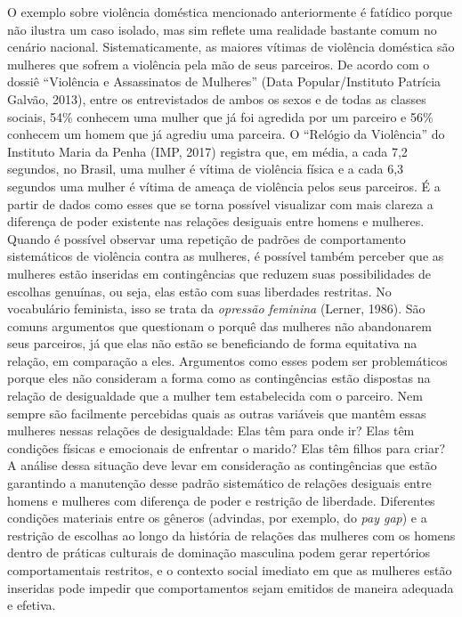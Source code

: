 O exemplo sobre violência doméstica mencionado anteriormente é fatídico porque não ilustra um caso isolado, mas sim reflete uma realidade bastante comum no cenário nacional. Sistematicamente, as maiores vítimas de violência doméstica são mulheres que sofrem a violência pela mão de seus parceiros. De acordo com o dossiê ``Violência e Assassinatos de Mulheres'' (Data Popular/Instituto Patrícia Galvão, 2013), entre os entrevistados de ambos os sexos e de todas as classes sociais, 54\% conhecem uma mulher que já foi agredida por um parceiro e 56\% conhecem um homem que já agrediu uma parceira. O ``Relógio da Violência'' do Instituto Maria da Penha (IMP, 2017) registra que, em média, a cada 7,2 segundos, no Brasil, uma mulher é vítima de violência física e a cada 6,3 segundos uma mulher é vítima de ameaça de violência pelos seus parceiros. É a partir de dados como esses que se torna possível visualizar com mais clareza a diferença de poder existente nas relações desiguais entre homens e mulheres. Quando é possível observar uma repetição de padrões de comportamento sistemáticos de violência contra as mulheres, é possível também perceber que as mulheres estão inseridas em contingências que reduzem suas possibilidades de escolhas genuínas, ou seja, elas estão com suas liberdades restritas. No vocabulário feminista, isso se trata da \textit{opressão feminina} (Lerner, 1986). São comuns argumentos que questionam o porquê das mulheres não abandonarem seus parceiros, já que elas não estão se beneficiando de forma equitativa na relação, em comparação a eles. Argumentos como esses podem ser problemáticos porque eles não consideram a forma como as contingências estão dispostas na relação de desigualdade que a mulher tem estabelecida com o parceiro. Nem sempre são facilmente percebidas quais as outras variáveis que mantêm essas mulheres nessas relações de desigualdade: Elas têm para onde ir? Elas têm condições físicas e emocionais de enfrentar o marido? Elas têm filhos para criar? A análise dessa situação deve levar em consideração as contingências que estão garantindo a manutenção desse padrão sistemático de relações desiguais entre homens e mulheres com diferença de poder e restrição de liberdade. Diferentes condições materiais entre os gêneros (advindas, por exemplo, do \textit{pay gap}) e a restrição de escolhas ao longo da história de relações das mulheres com os homens dentro de práticas culturais de dominação masculina podem gerar repertórios comportamentais restritos, e o contexto social imediato em que as mulheres estão inseridas pode impedir que comportamentos sejam emitidos de maneira adequada e efetiva.


